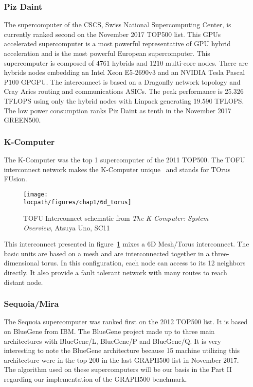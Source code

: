 \subsubsection{Piz Daint}
The supercomputer of the CSCS, Swiss National Supercomputing Center, is currently ranked second on the November 2017 TOP500 list. 
This GPUs accelerated supercomputer is a most powerful representative of GPU hybrid acceleration and is the most powerful European supercomputer. 
This supercomputer is composed of 4761 hybrids and 1210 multi-core nodes. 
There are hybrids nodes embedding an Intel Xeon E5-2690v3 and an NVIDIA Tesla Pascal P100 GPGPU. 
The interconnect is based on a Dragonfly network topology and Cray Aries routing and communications ASICs. 
The peak performance is 25.326 TFLOPS using only the hybrid nodes with Linpack generating 19.590 TFLOPS.
The low power consumption ranks Piz Daint as tenth in the November 2017 GREEN500.

\subsubsection{K-Computer}
The K-Computer was the top 1 supercomputer of the 2011 TOP500. 
The TOFU interconnect network makes the K-Computer unique~\cite{ajima2009tofu} and stands for TOrus FUsion.
\begin{figure}[t!]
\begin{center}
\texttt{[image: \\locpath/figures/chap1/6d\_torus]}
\end{center}
\caption{TOFU Interconnect schematic from \textit{The K-Computer: System Overview}, Atsuya Uno, SC11}
\label{fig:1_HPC:tofu}
\end{figure}
This interconnect presented in figure~\ref{fig:1_HPC:tofu} mixes a 6D Mesh/Torus interconnect.
The basic units are based on a mesh and are interconnected together in a three-dimensional torus. 
In this configuration, each node can access to its 12 neighbors directly. 
It also provide a fault tolerant network with many routes to reach distant node. 

\subsubsection{Sequoia/Mira}
The Sequoia supercomputer was ranked first on the 2012 TOP500 list. 
It is based on BlueGene from IBM.
The BlueGene project made up to three main architectures with BlueGene/L, BlueGene/P and BlueGene/Q.
It is very interesting to note the BlueGene architecture because 15 machine utilizing this architecture were in the top 200 in the last GRAPH500 list in November 2017.
The algorithm used on these supercomputers will be our basis in the Part II regarding our implementation of the GRAPH500 benchmark.

